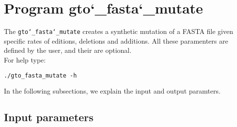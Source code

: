 \section{Program gto\char`_fasta\char`_mutate}
The \texttt{gto\char`_fasta\char`_mutate} creates a synthetic mutation of a FASTA file given specific rates of editions, deletions and additions. All these paramenters are defined by the user, and their are optional.\\
For help type:
\begin{lstlisting}
./gto_fasta_mutate -h
\end{lstlisting}
In the following subsections, we explain the input and output paramters.

\subsection*{Input parameters}

